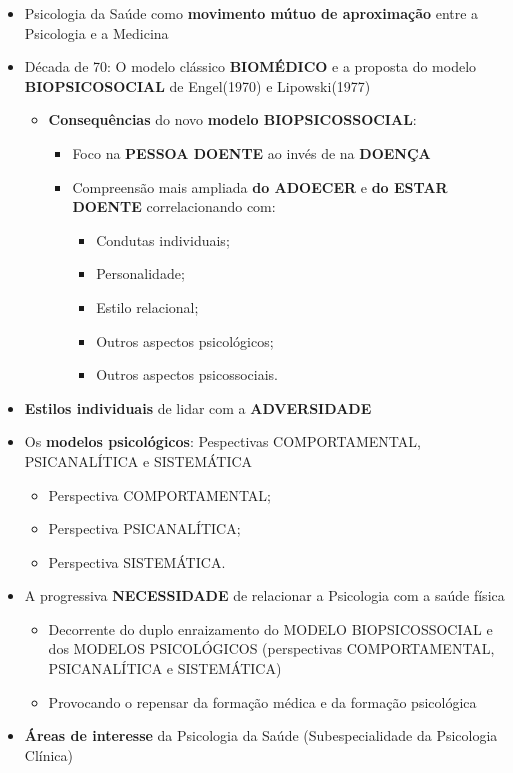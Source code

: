 \documentclass[
]{book}
\providecommand{\tightlist}{%
  \setlength{\itemsep}{0pt}\setlength{\parskip}{0pt}}
\begin{document}
\begin{itemize}
\tightlist
\item
  Psicologia da Saúde como \textbf{movimento mútuo de aproximação} entre a Psicologia e a Medicina
\item
  Década de 70: O modelo clássico \textbf{BIOMÉDICO} e a proposta do modelo \textbf{BIOPSICOSOCIAL} de Engel(1970) e Lipowski(1977)

  \begin{itemize}
  \tightlist
  \item
    \textbf{Consequências} do novo \textbf{modelo BIOPSICOSSOCIAL}:

    \begin{itemize}
    \tightlist
    \item
      Foco na \textbf{PESSOA DOENTE} ao invés de na \textbf{DOENÇA}
    \item
      Compreensão mais ampliada \textbf{do ADOECER} e \textbf{do ESTAR DOENTE} correlacionando com:

      \begin{itemize}
      \tightlist
      \item
        Condutas individuais;
      \item
        Personalidade;
      \item
        Estilo relacional;
      \item
        Outros aspectos psicológicos;
      \item
        Outros aspectos psicossociais.
      \end{itemize}
    \end{itemize}
  \end{itemize}
\item
  \textbf{Estilos individuais} de lidar com a \textbf{ADVERSIDADE}
\item
  Os \textbf{modelos psicológicos}: Pespectivas COMPORTAMENTAL, PSICANALÍTICA e SISTEMÁTICA

  \begin{itemize}
  \tightlist
  \item
    Perspectiva COMPORTAMENTAL;
  \item
    Perspectiva PSICANALÍTICA;
  \item
    Perspectiva SISTEMÁTICA.
  \end{itemize}
\item
  A progressiva \textbf{NECESSIDADE} de relacionar a Psicologia com a saúde física

  \begin{itemize}
  \tightlist
  \item
    Decorrente do duplo enraizamento do MODELO BIOPSICOSSOCIAL e dos MODELOS PSICOLÓGICOS (perspectivas COMPORTAMENTAL, PSICANALÍTICA e SISTEMÁTICA)
  \item
    Provocando o repensar da formação médica e da formação psicológica
  \end{itemize}
\item
  \textbf{Áreas de interesse} da Psicologia da Saúde (Subespecialidade da Psicologia Clínica)


\end{itemize}
\end{document}
